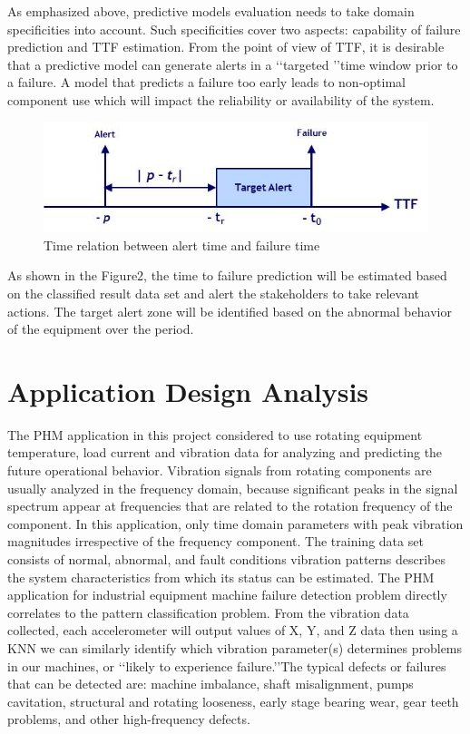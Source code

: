 \documentclass[sigconf]{acmart}
\begin{document}
As emphasized above, predictive models evaluation needs to take domain specificities into account. Such specificities cover two aspects: capability of failure prediction and TTF estimation. From the point of view of TTF, it is desirable that a predictive model can generate alerts in a \lq\lq targeted \rq\rq time window prior to a failure. A model that predicts a failure too early leads to non-optimal component use \cite{Yang2014} which will impact the reliability or availability of the system.

\begin{figure}
\includegraphics[width=1.0\columnwidth]{images/ttf_1}
\caption{Time relation between alert time and failure time} \label{fig:Figure2}
\end{figure}

As shown in the Figure2, the time to failure prediction will be estimated based on the classified result data set and alert the stakeholders to take relevant actions. The target alert zone will be identified based on the abnormal behavior of the equipment over the period.

\section{Application Design Analysis}
The PHM application in this project considered to use rotating equipment temperature, load current and vibration data for analyzing and predicting the future operational behavior. 
Vibration signals from rotating components are usually analyzed in the frequency domain, because significant peaks in the signal spectrum appear at frequencies that are related to the rotation frequency of the component. In this application, only time domain parameters with peak vibration magnitudes irrespective of the frequency component. The training data set consists of normal, abnormal, and fault conditions vibration patterns describes the system characteristics from which its status can be estimated.
The PHM application for industrial equipment machine failure detection problem directly correlates to the pattern classification problem. From the vibration data collected, each accelerometer will output values of X, Y, and Z data then using a KNN we can similarly identify which vibration parameter(s) determines problems in our machines, or \lq\lq likely to experience failure.\rq\rq The typical defects or failures that can be detected are: machine imbalance, shaft misalignment, pumps cavitation, structural and rotating looseness, early stage bearing wear, gear teeth problems, and other high-frequency defects.
\end{document}

